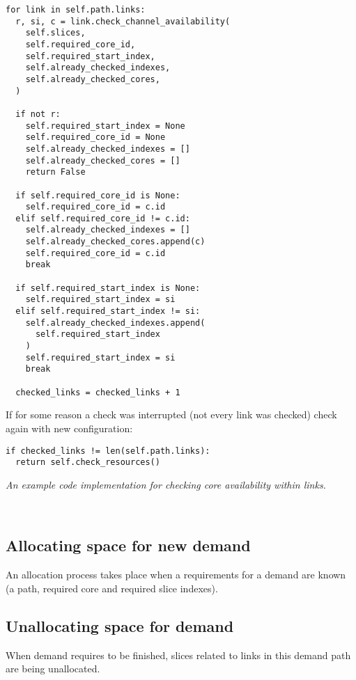\documentclass[conference]{IEEEtran}
\begin{document}
\begin{small}
\begin{lstlisting}[frame=single]
for link in self.path.links:
  r, si, c = link.check_channel_availability(
    self.slices,
    self.required_core_id,
    self.required_start_index,
    self.already_checked_indexes,
    self.already_checked_cores,
  ) 

  if not r:
    self.required_start_index = None
    self.required_core_id = None
    self.already_checked_indexes = []
    self.already_checked_cores = []
    return False

  if self.required_core_id is None:
    self.required_core_id = c.id
  elif self.required_core_id != c.id:
    self.already_checked_indexes = []
    self.already_checked_cores.append(c)
    self.required_core_id = c.id
    break

  if self.required_start_index is None:
    self.required_start_index = si
  elif self.required_start_index != si:
    self.already_checked_indexes.append(
      self.required_start_index
    )
    self.required_start_index = si
    break
    
  checked_links = checked_links + 1

\end{lstlisting}
\end{small}

If for some reason a check was interrupted (not every link was checked) check again with new configuration:
\begin{small}
\begin{lstlisting}[frame=single]
if checked_links != len(self.path.links):
  return self.check_resources()
\end{lstlisting}
\textit{An example code implementation for checking core availability within links.}
\end{small}
\\

\subsection{Allocating space for new demand}
An allocation process takes place when a requirements for a demand are known (a path, required core and required slice indexes).

\subsection{Unallocating space for demand}
When demand requires to be finished, slices related to links in this demand path are being unallocated.
\end{document}
